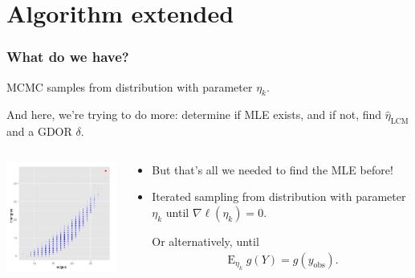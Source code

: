 \documentclass[slidestop,compress, 10pt]{beamer}
\DeclareMathOperator{\E}{E}
\newcommand{\etaLCM}{\hat{\eta}_{\textrm{LCM}}}
\newcommand{\yobs}{y_{\text{obs}}}
\begin{document}
\section{Algorithm extended}
\frame
{
\frametitle{What do we have?}
MCMC samples from distribution with parameter $\eta_k$.  

And here, we're trying to do more: determine if MLE exists, and if not, find $\etaLCM$ and 
a GDOR $\delta$.
\vspace{1ex}

\begin{columns}[t]
\begin{column}[T]{0.4\textwidth}
\includegraphics[width=2in]{MCsample-bare}
\end{column}

\begin{column}[r]{0.6\textwidth}
\pause

\begin{itemize}
\item But that's all we needed to find the MLE before! 


\item Iterated sampling from distribution with parameter $\eta_k$ until $\nabla \ell(\eta_k) = 0$.

Or alternatively, until
\begin{align*}
	\E_{\eta_k} g(Y) = g(\yobs).
\end{align*}

\end{itemize}
\end{column}
\end{columns}
}
\end{document}
